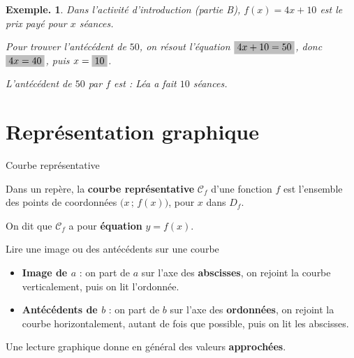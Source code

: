 \documentclass[12pt]{article}
\theoremstyle{break}
\newtheorem*{example}{Exemple.}
\begin{document}
\begin{example}
  Dans l'activité d'introduction (partie B), $f(x) = 4x + 10$ est le prix payé pour $x$ séances.

  Pour trouver l'antécédent de $50$, on résout l'équation $\hideM{4x + 10 = 50}$, donc $\hideM{4x = 40}$, puis $x = \hideM{10}$.

  L'antécédent de $50$ par $f$ est  : Léa a fait $10$ séances.
\end{example}

\section{Représentation graphique}

\begin{definition}{Courbe représentative}{}
  \begin{multihide}
    Dans un repère, la \textbf{courbe représentative} $\mathcal{C}_f$ d'une fonction $f$ est l'ensemble des points de coordonnées $\big(x\,;\,f(x)\big)$, pour $x$ dans $D_f$.

    On dit que $\mathcal{C}_f$ a pour \textbf{équation} $y = f(x)$.
  \end{multihide}
\end{definition}

\begin{method}{Lire une image ou des antécédents sur une courbe}{}
  \begin{itemize}
    \item \textbf{Image de $a$} : on part de $a$ sur l'axe des \textbf{abscisses}, on rejoint la courbe verticalement, puis on lit l'ordonnée.
    \item \textbf{Antécédents de $b$} : on part de $b$ sur l'axe des \textbf{ordonnées}, on rejoint la courbe horizontalement, autant de fois que possible, puis on lit les abscisses.
  \end{itemize}
  Une lecture graphique donne en général des valeurs \textbf{approchées}.
\end{method}
\end{document}
